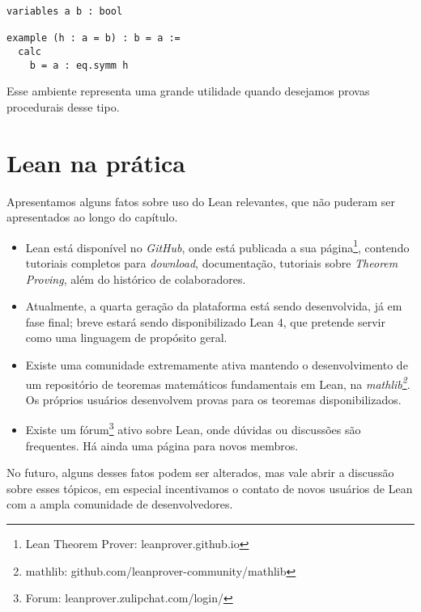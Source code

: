 \vspace{5mm}
\begin{lstlisting}
variables a b : bool

example (h : a = b) : b = a :=
  calc
    b = a : eq.symm h
\end{lstlisting}
\vspace{5mm}

\noindent Esse ambiente representa uma grande utilidade quando desejamos provas procedurais desse tipo.

\section{Lean na prática}
Apresentamos alguns fatos sobre uso do Lean relevantes, que não puderam ser apresentados ao longo do capítulo.

\begin{itemize}
    \item Lean está disponível no \textit{GitHub}, onde está publicada a sua página\footnote{Lean Theorem Prover: leanprover.github.io}, contendo tutoriais completos para \textit{download}, documentação, tutoriais sobre \textit{Theorem Proving}, além do histórico de colaboradores.

    \item Atualmente, a quarta geração da plataforma está sendo desenvolvida, já em fase final; breve estará sendo disponibilizado Lean 4, que pretende servir como uma linguagem de propósito geral.

    \item Existe uma comunidade extremamente ativa mantendo o desenvolvimento de um repositório de teoremas matemáticos fundamentais em Lean, na \textit{mathlib\footnote{mathlib: github.com/leanprover-community/mathlib}}. Os próprios usuários desenvolvem provas para os teoremas disponibilizados.

    \item Existe um fórum\footnote{Forum: leanprover.zulipchat.com/login/} ativo sobre Lean, onde dúvidas ou discussões são frequentes. Há ainda uma página para novos membros.
\end{itemize}

\noindent No futuro, alguns desses fatos podem ser alterados, mas vale abrir a discussão sobre esses tópicos, em especial incentivamos o contato de novos usuários de Lean com a ampla comunidade de desenvolvedores.
